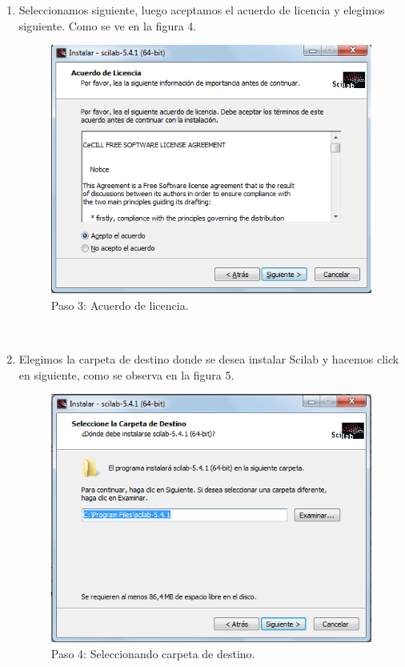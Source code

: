 \documentclass[11pt]{article} %
\begin{document}
\begin{enumerate}
\item Seleccionamos siguiente, luego aceptamos el acuerdo de licencia y elegimos siguiente. Como se ve en la figura 4.
\\%
\begin{figure}[!h]
  \centering
    \includegraphics[scale=0.5]{Captura3}
  \caption{Paso 3: Acuerdo de licencia.}
  \label{fig:paso3}
\end{figure}
\\%

\item Elegimos la carpeta de destino donde se desea instalar Scilab y hacemos click en siguiente, como se observa en la figura 5.
\\%
\begin{figure}[!h]
  \centering
    \includegraphics[scale=0.5]{Captura4}
  \caption{Paso 4: Seleccionando carpeta de destino.}
  \label{fig:paso4}
\end{figure}
\\%


\end{enumerate}
\end{document}
